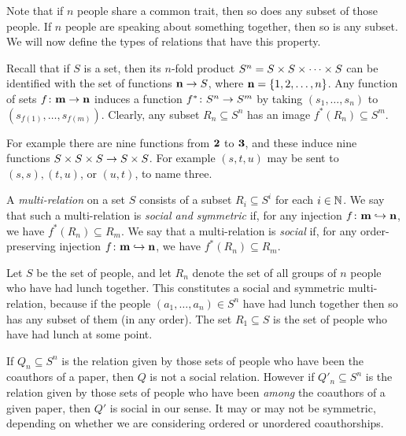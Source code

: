 \documentclass{amsart}
\def\ss{\subseteq}
\def\bfn{{\bf n}}
\def\bfm{{\bf m}}
\begin{document}
Note that if $n$ people share a common trait, then so does any subset of those people.  If $n$ people are speaking about something together, then so is any subset.  We will now define the types of relations that have this property.

Recall that if $S$ is a set, then its $n$-fold product $S^n=S\times S\times\cdots\times S$ can be identified with the set of functions $\bfn\to S$, where $\bfn=\{1,2,\ldots,n\}$.  Any function of sets $f\taking\bfm\to\bfn$ induces a function $f^*\colon S^n\rightarrow S^m$ by taking $(s_1,\ldots,s_n)$ to $(s_{f(1)},\ldots,s_{f(m)})$.  Clearly, any subset $R_n\ss S^n$ has an image $f^*(R_n)\ss S^m$.

For example there are nine functions from ${\bf 2}$ to $\bf{3}$, and these induce nine functions $S\times S\times S\rightarrow S\times S$.  For example $(s,t,u)$ may be sent to $(s,s), (t,u)$, or $(u,t)$, to name three.

\begin{definition}

A {\em multi-relation} on a set $S$ consists of a subset $R_i\ss S^i$ for each $i\in{\mathbb N}$.  We say that such a multi-relation is {\em social and symmetric} if, for any injection $f\taking\bfm\inj\bfn$, we have $f^*(R_n)\ss R_m$.   We say that a multi-relation is {\em social} if, for any order-preserving injection $f\taking\bfm\inj\bfn$, we have $f^*(R_n)\ss R_m$.

\end{definition}

\begin{example}

Let $S$ be the set of people, and let $R_n$ denote the set of all groups of $n$ people who have had lunch together.  This constitutes a social and symmetric multi-relation, because if the people $(a_1,\ldots,a_n)\in S^n$ have had lunch together then so has any subset of them (in any order).  The set $R_1\ss S$ is the set of people who have had lunch at some point.

If $Q_n\ss S^n$ is the relation given by those sets of people who have been the coauthors of a paper, then $Q$ is not a social relation.  However if $Q'_n\ss S^n$ is the relation given by those sets of people who have been {\em among} the coauthors of a given paper, then $Q'$ is social in our sense.  It may or may not be symmetric, depending on whether we are considering ordered or unordered coauthorships.  

\end{example}
\end{document}
